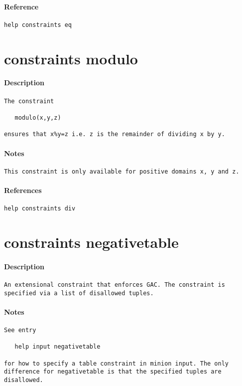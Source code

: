 \paragraph{Reference}
{\footnotesize
\begin{verbatim}
help constraints eq
\end{verbatim}
}
\section{constraints modulo}
\paragraph{Description}
{\footnotesize
\begin{verbatim}
The constraint
 
   modulo(x,y,z)

ensures that x%y=z i.e. z is the remainder of dividing x by y.
\end{verbatim}
}
\paragraph{Notes}
{\footnotesize
\begin{verbatim}
This constraint is only available for positive domains x, y and z.
\end{verbatim}
}
\paragraph{References}
{\footnotesize
\begin{verbatim}
help constraints div
\end{verbatim}
}
\section{constraints negativetable}
\paragraph{Description}
{\footnotesize
\begin{verbatim}
An extensional constraint that enforces GAC. The constraint is
specified via a list of disallowed tuples.
\end{verbatim}
}
\paragraph{Notes}
{\footnotesize
\begin{verbatim}
See entry 

   help input negativetable

for how to specify a table constraint in minion input. The only
difference for negativetable is that the specified tuples are
disallowed.
\end{verbatim}
}
